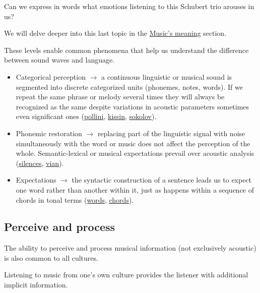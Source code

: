Can we express in words what emotions listening to this Schubert trio arouses in us?

We will delve deeper into this last topic in the \hyperref[meaning]{Music’s meaning} section.

These levels enable common phenomena that help us understand the difference between sound waves and language.

\begin{itemize}
\item Categorical perception \(\rightarrow\) a continuous linguistic or musical sound is segmented into discrete categorized units (phonemes, notes, words). If we repeat the same phrase or melody several times they will always be recognized as the same despite variations in acoustic parameters sometimes even significant ones (\href{https://github.com/musicaecodice/EMC/blob/main/1_premises/suoni/pollini.mp3}{pollini}, \href{https://github.com/musicaecodice/EMC/blob/main/1_premises/suoni/kissin.mp3}{kissin}, \href{https://github.com/musicaecodice/EMC/blob/main/1_premises/suoni/sokolov.mp3}{sokolov}).
\item Phonemic restoration \(\rightarrow\) replacing part of the linguistic signal with noise simultaneously with the word or music does not affect the perception of the whole. Semantic-lexical or musical expectations prevail over acoustic analysis (\href{https://github.com/musicaecodice/EMC/blob/main/1_premises/suoni/buchi.mp3}{silences},  \href{https://github.com/musicaecodice/EMC/blob/main/1_premises/suoni/vian.mp3}{vian}).
\item Expectations \(\rightarrow\) the syntactic construction of a sentence leads us to expect one word rather than another within it, just as happens within a sequence of chords in tonal terms (\href{https://github.com/musicaecodice/EMC/blob/main/1_premises/suoni/analisi.mp3}{words}, \href{https://github.com/musicaecodice/EMC/blob/main/1_premises/suoni/accordi.mp3}{chords}).
\end{itemize}

\subsection{Perceive and process }\label{perceive-and-process}

The ability to perceive and process musical information (not exclusively acoustic) is also common to all cultures.

Listening to music from one's own culture provides the listener with additional implicit information.

